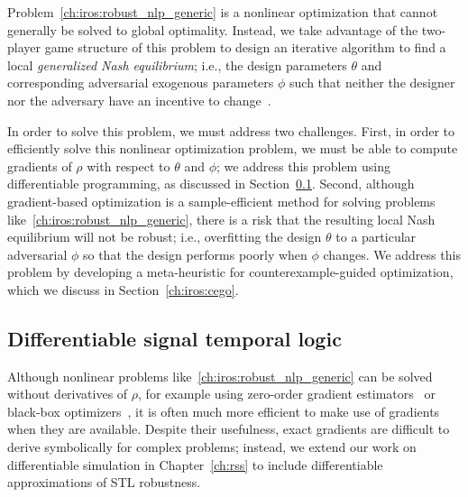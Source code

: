 Problem~\eqref{ch:iros:robust_nlp_generic} is a nonlinear optimization that cannot generally be solved to global optimality. Instead, we take advantage of the two-player game structure of this problem to design an iterative algorithm to find a local \textit{generalized Nash equilibrium}; i.e., the design parameters $\theta$ and corresponding adversarial exogenous parameters $\phi$ such that neither the designer nor the adversary have an incentive to change~\cite{facchineiGeneralizedNashEquilibrium2007}.

In order to solve this problem, we must address two challenges. First, in order to efficiently solve this nonlinear optimization problem, we must be able to compute gradients of $\rho$ with respect to $\theta$ and $\phi$; we address this problem using differentiable programming, as discussed in Section~\ref{ch:iros:diffstl}. Second, although gradient-based optimization is a sample-efficient method for solving problems like~\eqref{ch:iros:robust_nlp_generic}, there is a risk that the resulting local Nash equilibrium will not be robust; i.e., overfitting the design $\theta$ to a particular adversarial $\phi$ so that the design performs poorly when $\phi$ changes. We address this problem by developing a meta-heuristic for counterexample-guided optimization, which we discuss in Section~\ref{ch:iros:cego}.

\subsection{Differentiable signal temporal logic}\label{ch:iros:diffstl}

Although nonlinear problems like~\eqref{ch:iros:robust_nlp_generic} can be solved without derivatives of $\rho$, for example using zero-order gradient estimators~\cite{suh2021_bundled_gradients} or black-box optimizers~\cite{corsoSurveyAlgorithmsBlackBox2021}, it is often much more efficient to make use of gradients when they are available. Despite their usefulness, exact gradients are difficult to derive symbolically for complex problems; instead, we extend our work on differentiable simulation in Chapter~\ref{ch:rss} to include differentiable approximations of STL robustness.

